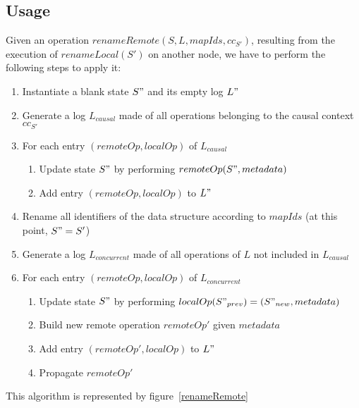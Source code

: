 \documentclass[a4paper]{article}
\begin{document}
\subsection{Usage}
\label{sec:usage}

Given an operation $renameRemote(S, L, mapIds, cc_{S'})$,
resulting from the execution of $renameLocal(S')$ on another node,
we have to perform the following steps to apply it:

\begin{enumerate}
  \item Instantiate a blank state $S"$ and its empty log $L"$
  \item Generate a log $L_{causal}$
    made of all operations belonging to the causal context $cc_{S'}$
  \item For each entry $(remoteOp, localOp)$ of $L_{causal}$
  \begin{enumerate}
    \item Update state $S"$ by performing  $remoteOp(S", metadata)$
    \item Add entry $(remoteOp, localOp)$ to $L"$
  \end{enumerate}
  \item Rename all identifiers of the data structure according to $mapIds$ (at this point, $S" = S'$)
  \item Generate a log $L_{concurrent}$ made of all operations of $L$ not included in $L_{causal}$
  \item For each entry $(remoteOp, localOp)$ of $L_{concurrent}$
  \begin{enumerate}
    \item Update state $S"$ by performing $localOp(S"_{prev}) = (S"_{new}, metadata)$
    \label{itm:replay-local-op}
    \item Build new remote operation $remoteOp'$ given $metadata$
    \label{itm:regenerate-remote-op}
    \item Add entry $(remoteOp', localOp)$ to $L"$
    \item Propagate $remoteOp'$
  \end{enumerate}
\end{enumerate}

This algorithm is represented by figure~\ref{renameRemote}
\end{document}
